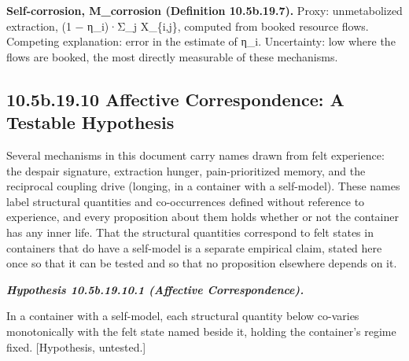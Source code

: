\documentclass[
]{article}
\begin{document}
\textbf{Self-corrosion, M\_corrosion (Definition 10.5b.19.7).} Proxy:
unmetabolized extraction, (1 − η\_i)·Σ\_j X\_\{i,j\}, computed from
booked resource flows. Competing explanation: error in the estimate of
η\_i. Uncertainty: low where the flows are booked, the most directly
measurable of these mechanisms.

\hypertarget{b.19.10-affective-correspondence-a-testable-hypothesis}{%
\subsection{10.5b.19.10 Affective Correspondence: A Testable
Hypothesis}\label{b.19.10-affective-correspondence-a-testable-hypothesis}}

Several mechanisms in this document carry names drawn from felt
experience: the despair signature, extraction hunger, pain-prioritized
memory, and the reciprocal coupling drive (longing, in a container with
a self-model). These names label structural quantities and
co-occurrences defined without reference to experience, and every
proposition about them holds whether or not the container has any inner
life. That the structural quantities correspond to felt states in
containers that do have a self-model is a separate empirical claim,
stated here once so that it can be tested and so that no proposition
elsewhere depends on it.

\emph{\textbf{Hypothesis 10.5b.19.10.1 (Affective Correspondence).}}

In a container with a self-model, each structural quantity below
co-varies monotonically with the felt state named beside it, holding the
container's regime fixed. {[}Hypothesis, untested.{]}
\end{document}
